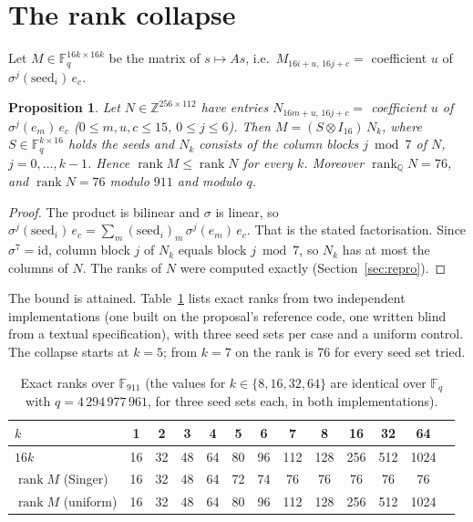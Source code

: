 \documentclass[11pt]{article}
\newtheorem{proposition}{Proposition}
\theoremstyle{remark}
\newcommand{\F}{\mathbb{F}}
\DeclareMathOperator{\rank}{rank}
\begin{document}
\section{The rank collapse}\label{sec:rank}

Let $M\in\F_q^{16k\times16k}$ be the matrix of $s\mapsto As$, i.e.\ $M_{16i+u,\,16j+c}=$ coefficient $u$ of
$\sigma^{j}(\mathrm{seed}_i)\,e_c$.

\begin{proposition}\label{prop:rank}
Let $N\in\mathbb{Z}^{256\times112}$ have entries $N_{16m+u,\,16j+c}=$ coefficient $u$ of $\sigma^{j}(e_m)\,e_c$
($0\le m,u,c\le15$, $0\le j\le6$). Then $M=(S\otimes I_{16})\,N_k$, where $S\in\F_q^{k\times16}$ holds the seeds and
$N_k$ consists of the column blocks $j\bmod 7$ of $N$, $j=0,\dots,k-1$. Hence $\rank M\le\rank N$ for every $k$.
Moreover $\rank_{\mathbb{Q}}N=76$, and $\rank N=76$ modulo $911$ and modulo $q$.
\end{proposition}

\begin{proof}
The product is bilinear and $\sigma$ is linear, so $\sigma^{j}(\mathrm{seed}_i)\,e_c=\sum_m(\mathrm{seed}_i)_m\,
\sigma^{j}(e_m)\,e_c$. That is the stated factorisation. Since $\sigma^7=\mathrm{id}$, column block $j$ of $N_k$ equals
block $j\bmod7$, so $N_k$ has at most the columns of $N$. The ranks of $N$ were computed exactly (Section~\ref{sec:repro}).
\end{proof}

The bound is attained. Table~\ref{tab:rank} lists exact ranks from two independent implementations (one built on the
proposal's reference code, one written blind from a textual specification), with three seed sets per case and a
uniform control. The collapse starts at $k=5$; from $k=7$ on the rank is 76 for every seed set tried.

\begin{table}[h]\centering\small
\begin{tabular}{lcccccccccccc}\toprule
$k$ & 1&2&3&4&5&6&7&8&16&32&64\\\midrule
$16k$ & 16&32&48&64&80&96&112&128&256&512&1024\\
$\rank M$ (Singer) & 16&32&48&64&72&74&76&76&76&76&76\\
$\rank M$ (uniform) & 16&32&48&64&80&96&112&128&256&512&1024\\\bottomrule
\end{tabular}
\caption{Exact ranks over $\F_{911}$ (the values for $k\in\{8,16,32,64\}$ are identical over $\F_q$ with
$q=4\,294\,977\,961$, for three seed sets each, in both implementations).}\label{tab:rank}
\end{table}
\end{document}
